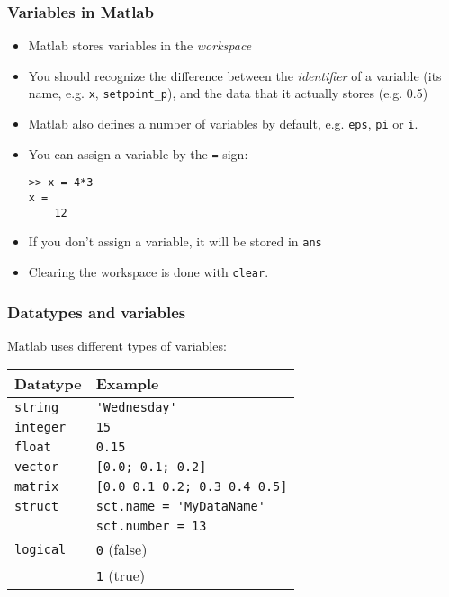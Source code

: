\begin{frame}[fragile]
 \frametitle{Variables in Matlab}
  \begin{itemize}
   \item Matlab stores variables in the \emph{workspace}\pause
   \item You should recognize the difference between the \emph{identifier} of a variable (its name, e.g. \lstinline$x$, \lstinline$setpoint_p$), and the data that it actually stores (e.g. 0.5)\pause
   \item Matlab also defines a number of variables by default, e.g. \lstinline$eps$, \lstinline$pi$ or \lstinline$i$.\pause
   \item You can assign a variable by the \lstinline$=$ sign:
   \begin{lstlisting}
>> x = 4*3
x =
    12
   \end{lstlisting}\pause
   \item If you don't assign a variable, it will be stored in \lstinline$ans$
   \item Clearing the workspace is done with \lstinline$clear$.
 \end{itemize}
\end{frame}

\begin{frame}[fragile]
    \frametitle{Datatypes and variables}
    Matlab uses different types of variables:
        \begin{longtable}{l!{\vrule}l}
         Datatype        & Example \\ \hline
         \texttt{string} & \lstinline$'Wednesday'$ \\
         \texttt{integer}& \lstinline$15$ \\
         \texttt{float}  & \lstinline$0.15$ \\
         \texttt{vector} & \lstinline$[0.0; 0.1; 0.2]$ \\
         \texttt{matrix} & \lstinline$[0.0 0.1 0.2; 0.3 0.4 0.5]$ \\
         \texttt{struct} & \lstinline$sct.name = 'MyDataName'$ \\
                         & \lstinline$sct.number = 13$ \\
         \texttt{logical}& \lstinline$0$ (false)  \\
                         & \lstinline$1$ (true) \\
       \end{longtable}
   \end{frame}
   
